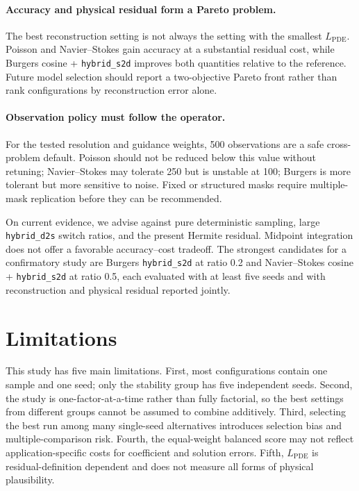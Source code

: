 \documentclass[twoside,11pt]{article}
\newcommand{\Lpde}{L_{\mathrm{PDE}}}
\newcommand{\hsd}{\texttt{hybrid\_s2d}}
\newcommand{\hds}{\texttt{hybrid\_d2s}}
\begin{document}
\paragraph{Accuracy and physical residual form a Pareto problem.}
The best reconstruction setting is not always the setting with the smallest
\(\Lpde\).  Poisson and Navier--Stokes gain accuracy at a substantial residual
cost, while Burgers cosine + \hsd{} improves both quantities relative to the
reference.  Future model selection should report a two-objective Pareto front
rather than rank configurations by reconstruction error alone.

\paragraph{Observation policy must follow the operator.}
For the tested resolution and guidance weights, 500 observations are a safe
cross-problem default.  Poisson should not be reduced below this value without
retuning; Navier--Stokes may tolerate 250 but is unstable at 100; Burgers is
more tolerant but more sensitive to noise.  Fixed or structured masks require
multiple-mask replication before they can be recommended.

On current evidence, we advise against pure deterministic sampling, large
\hds{} switch ratios, and the present Hermite residual.  Midpoint integration
does not offer a favorable accuracy--cost tradeoff.  The strongest candidates
for a confirmatory study are Burgers \hsd{} at ratio 0.2 and
Navier--Stokes cosine + \hsd{} at ratio 0.5, each evaluated with at least five
seeds and with reconstruction and physical residual reported jointly.

\section{Limitations}
\label{sec:limitations}

This study has five main limitations.  First, most configurations contain one
sample and one seed; only the stability group has five independent seeds.
Second, the study is one-factor-at-a-time rather than fully factorial, so the
best settings from different groups cannot be assumed to combine additively.
Third, selecting the best run among many single-seed alternatives introduces
selection bias and multiple-comparison risk.  Fourth, the equal-weight
balanced score may not reflect application-specific costs for coefficient and
solution errors.  Fifth, \(\Lpde\) is residual-definition dependent and does
not measure all forms of physical plausibility.
\end{document}
